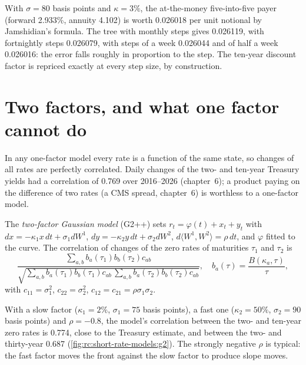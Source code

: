 \begin{example}\label{ex:rc:short-rate-models:tree}
With $\sigma = 80$ basis points and $\kappa=3\%$, the at-the-money five-into-five payer
(forward 2.933\%, annuity 4.102) is worth 0.026018 per unit notional by
Jamshidian's formula. The tree with monthly steps gives 0.026119, with
fortnightly steps 0.026079, with steps of a week 0.026044 and of half a week
0.026016: the error falls roughly in proportion to the step. The ten-year
discount factor is repriced exactly at every step size, by construction.
\end{example}

\section{Two factors, and what one factor cannot do}

In any one-factor model every rate is a function of the same state, so changes
of all rates are perfectly correlated. Daily changes of the two- and ten-year
Treasury yields had a correlation of 0.769 over 2016--2026 (chapter~6); a
product paying on the difference of two rates (a CMS spread, chapter~6) is
worthless to a one-factor model.

\begin{definition}\label{def:rc:short-rate-models:g2}
The \emph{two-factor Gaussian model} (G2++) sets
$r_t = \varphi(t)+x_t+y_t$ with $dx = -\kappa_1x\,dt+\sigma_1dW^1$, $dy =
-\kappa_2y\,dt+\sigma_2dW^2$, $d\langle W^1,W^2\rangle = \rho\,dt$, and $\varphi$ fitted to
the curve. The correlation of changes of the zero rates of maturities $\tau_1$ and
$\tau_2$ is
\[
\frac{\sum_{a,b}b_a(\tau_1)b_b(\tau_2)c_{ab}}{\sqrt{\sum_{a,b}b_a(\tau_1)b_b(\tau_1)c_{ab}\,\sum_{a,b}b_a(\tau_2)b_b(\tau_2)c_{ab}}},
\quad b_a(\tau)=\frac{B(\kappa_a,\tau)}{\tau},
\]
with $c_{11}=\sigma_1^2$, $c_{22}=\sigma_2^2$, $c_{12}=c_{21}=\rho\sigma_1\sigma_2$.
\end{definition}

\begin{example}\label{ex:rc:short-rate-models:g2}
With a slow factor ($\kappa_1=2\%$, $\sigma_1=75$ basis points), a fast one ($\kappa_2=50\%$,
$\sigma_2=90$ basis points) and $\rho=-0.8$, the model's correlation between the two-
and ten-year zero rates is 0.774, close to the Treasury estimate, and between the
two- and thirty-year 0.687 (\cref{fig:rc:short-rate-models:g2}). The strongly
negative $\rho$ is typical: the fast factor moves the front against the slow
factor to produce slope moves.
\end{example}

